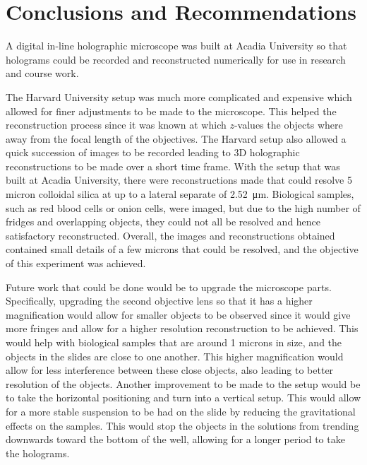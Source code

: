%
%
\chapter{Conclusions and Recommendations} \label{chap:Conclusion}

A digital in-line holographic microscope was built at Acadia University
so that holograms could be recorded and reconstructed numerically 
for use in research and course work.

The Harvard University setup was much more complicated and expensive which
allowed for finer adjustments to be made to the microscope. This helped the
reconstruction process since it was known at which $z$-values the objects where
away from the focal length of the objectives. The Harvard setup also allowed
a quick succession of images to be recorded leading to 3D holographic
reconstructions to
be made over a short time frame.
With the
setup that was built at Acadia University, there were
reconstructions made that could resolve 5 micron colloidal silica at up to a
lateral separate of \SI{2.52}{\micro\meter}. Biological
samples, such as red blood cells or onion cells, were imaged, but due to the
high number of
fridges and overlapping objects, they could not all be resolved 
and hence satisfactory reconstructed.
Overall, the images and reconstructions obtained
contained small details of a few microns that could be resolved,
and the objective of this experiment was achieved.

Future work that could be done would be to upgrade the microscope parts.
Specifically, upgrading the second objective lens so that it has a higher magnification
would allow for smaller objects to be observed since it would give more fringes and
allow for a higher resolution reconstruction to be achieved. This would help
with biological samples that are around 1 microns
in size, and the objects in the slides are close to one another. This higher
magnification would allow for less interference between these close objects,
also leading to better resolution of the objects. Another improvement to be
made to the setup would be to take the horizontal positioning and turn into a
vertical setup. This would allow for a more stable suspension to be had on the slide
by reducing the gravitational effects on the samples. This would stop the
objects in the solutions from trending downwards toward the bottom of the well, allowing
for a longer period to take the holograms.

